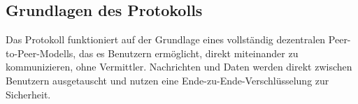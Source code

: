 \subsection{Grundlagen des Protokolls}

Das Protokoll funktioniert auf der Grundlage eines vollständig dezentralen 
Peer-to-Peer-Modells, das es Benutzern ermöglicht, direkt miteinander zu 
kommunizieren, ohne Vermittler.
Nachrichten und Daten werden direkt zwischen Benutzern ausgetauscht und nutzen 
eine Ende-zu-Ende-Verschlüsselung zur Sicherheit.